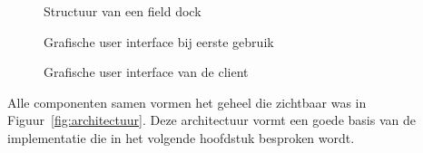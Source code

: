 \begin{figure}[!ht]
\centering
{}
\caption{Structuur van een field dock}
\label{fig:fieldDock}

\caption{Grafische user interface bij eerste gebruik}
\label{fig:startClient}

\caption{Grafische user interface van de client}
\label{fig:overviewClient}



\end{figure}

Alle componenten samen vormen het geheel die zichtbaar was in Figuur~\vref{fig:architectuur}.
Deze architectuur vormt een goede basis van de implementatie die in het volgende hoofdstuk besproken wordt.

